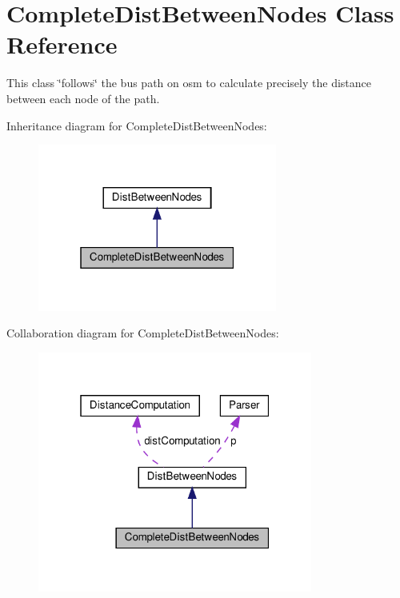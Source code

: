 \hypertarget{classCompleteDistBetweenNodes}{}\section{Complete\+Dist\+Between\+Nodes Class Reference}
\label{classCompleteDistBetweenNodes}


This class \char`\"{}follows\char`\"{} the bus path on osm to calculate precisely the distance between each node of the path.  




Inheritance diagram for Complete\+Dist\+Between\+Nodes\+:\nopagebreak
\begin{figure}[H]
\begin{center}
\leavevmode
\includegraphics[width=223pt]{classCompleteDistBetweenNodes__inherit__graph}
\end{center}
\end{figure}


Collaboration diagram for Complete\+Dist\+Between\+Nodes\+:\nopagebreak
\begin{figure}[H]
\begin{center}
\leavevmode
\includegraphics[width=256pt]{classCompleteDistBetweenNodes__coll__graph}
\end{center}
\end{figure}
